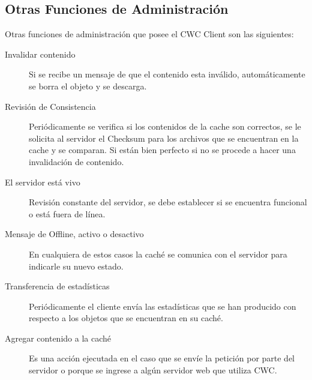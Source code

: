 \subsection{Otras Funciones de Administración}
Otras funciones de administración que posee el CWC Client son las siguientes:
\begin{description}
\item[Invalidar contenido] Si se recibe un mensaje de que el contenido esta inválido, automáticamente se borra el objeto y se descarga.

\item [Revisión de Consistencia] Periódicamente se verifica si los contenidos de la cache son correctos, se le solicita al servidor el Checksum para los archivos que se encuentran en la cache y se comparan. Si están bien perfecto si no se procede a hacer una invalidación de contenido.

\item [El servidor está vivo] Revisión constante del servidor, se debe establecer si se encuentra funcional o está fuera de línea.

\item [Mensaje de Offline, activo o desactivo] En cualquiera de estos casos la caché se comunica con el servidor para indicarle su nuevo estado.

\item [Transferencia de estadísticas] Periódicamente el cliente envía las estadísticas que se han producido con respecto a los objetos que se encuentran en su caché. 

\item [Agregar contenido a la caché] Es una acción ejecutada en el caso que se envíe la petición por parte del servidor o porque se ingrese a algún servidor web que utiliza CWC.
\end{description}
